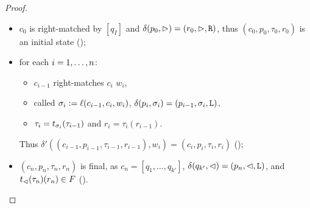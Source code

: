 \begin{proof}
	\begin{itemize}
		\item $c_0$ is right-matched by $[q_I]$ and $\delta(p_0,\rhd)=(r_0,\rhd,\mathtt R)$, thus $(c_0,p_0,\tau_0,r_0)$ is an initial state ();
		\item for each $i=1,\dots,n$:
		      \begin{itemize}
			      \item $c_{i-1}$ right-matches $c_i$ \wrt $w_i$,
			      \item called $\sigma_i:=\ell(c_{i-1},c_i,w_i)$, $\delta(p_i,\sigma_i)=(p_{i-1},\sigma_i,\mathtt L)$,
			      \item $\tau_i=t_{\sigma_i}(\tau_{i-1})$ and $r_i=\tau_i(r_{i-1})$.
		      \end{itemize}
		      Thus $\delta'((c_{i-1},p_{i-1},\tau_{i-1},r_{i-1}),w_i)=(c_i,p_i,\tau_i,r_i)$ ();
		\item $(c_n,p_n,\tau_n,r_n)$ is final, as $c_n=[q_1,\dots,q_{k'}]$, $\delta(q_{k'},\lhd)=(p_n,\lhd,\mathtt L)$, and $t_\lhd(\tau_n)(r_n)\in F$ (). \qedhere
	\end{itemize}
\end{proof}

